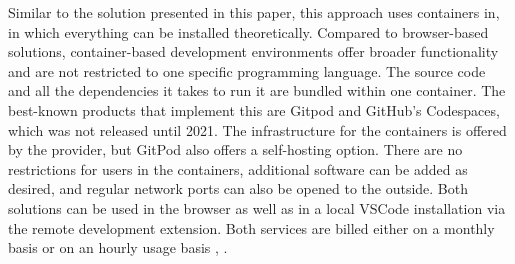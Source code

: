 Similar to the solution presented in this paper, this approach uses containers in, in which everything can be installed theoretically. Compared to browser-based solutions, container-based development environments offer broader functionality and are not restricted to one specific programming language. The source code and all the dependencies it takes to run it are bundled within one container. The best-known products that implement this are Gitpod and GitHub's Codespaces, which was not released until 2021. The infrastructure for the containers is offered by the provider, but GitPod also offers a self-hosting option. There are no restrictions for users in the containers, additional software can be added as desired, and regular network ports can also be opened to the outside. Both solutions can be used in the browser as well as in a local \ac{VSCode} installation via the remote development extension.\newline
Both services are billed either on a monthly basis or on an hourly usage basis \cite{githubcodespace}, \cite{gitpod}.
